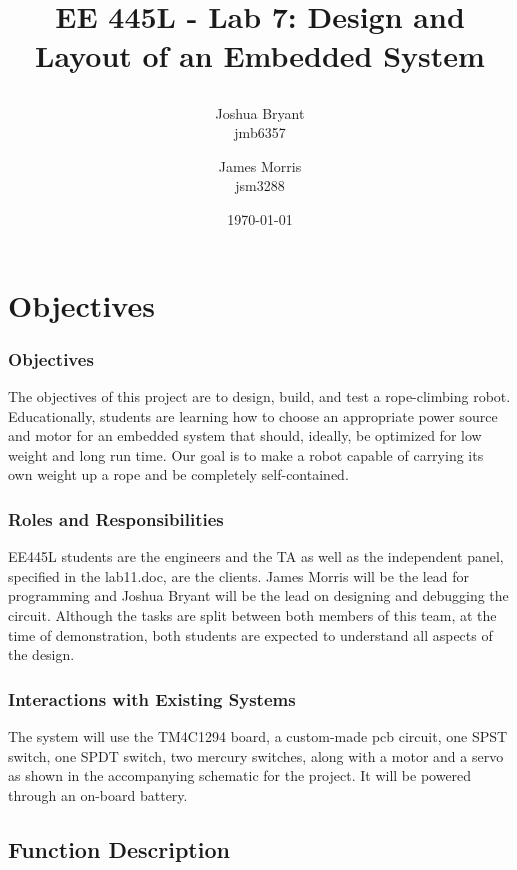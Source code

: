 \documentclass{article}
\title{\begin{LARGE}
	\textbf{EE 445L - Lab 7: Design and Layout of an Embedded System}
\end{LARGE}} %
\author{Joshua Bryant \\ jmb6357 \and James Morris \\ jsm3288} %
\date{\today} %
\begin{document}
\maketitle %


\section{Objectives}

		\subsubsection{Objectives}
			The objectives of this project are to design, build, and test a rope-climbing robot. Educationally, students are learning how to choose an appropriate power source and motor for an embedded system that should, ideally, be optimized for low weight and long run time. Our goal is to make a robot capable of carrying its own weight up a rope and be completely self-contained.
		\subsubsection{Roles and Responsibilities}
			EE445L students are the engineers and the TA as well as the independent panel, specified in the lab11.doc, are the clients. James Morris will be the lead for programming and Joshua Bryant will be the lead on designing and debugging the circuit. Although the tasks are split between both members of this team, at the time of demonstration, both students are expected to understand all aspects of the design.
		\subsubsection{Interactions with Existing Systems}
			The system will use the TM4C1294 board, a custom-made pcb circuit, one SPST switch, one SPDT switch, two mercury switches, along with a motor and a servo as shown in the accompanying schematic for the project. It will be powered through an on-board battery.
	\subsection{Function Description}
\end{document}
